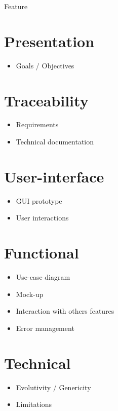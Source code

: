 \documentclass[10pt]{article}
\begin{document}
  \begin{center}
    \Huge{Feature}
  \end{center}
  
  \section*{Presentation}
  \begin{itemize}
    \item Goals / Objectives
  \end{itemize}

  \section*{Traceability}
  \begin{itemize}
    \item Requirements
    \item Technical documentation
  \end{itemize}
  
  \section*{User-interface}
  \begin{itemize}
    \item GUI prototype
    \item User interactions
  \end{itemize}
  
  \section*{Functional}
  \begin{itemize}
    \item Use-case diagram
    \item Mock-up
    \item Interaction with others features
    \item Error management
  \end{itemize}

  \section*{Technical}
  \begin{itemize}
    \item Evolutivity / Genericity
    \item Limitations
  \end{itemize}
  
\end{document}
